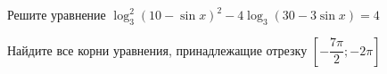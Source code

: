 \begin{ex}
	\begin{condition}
		\begin{enumcols}[label=\asbuk*)]
			\item Решите уравнение \( \log_3^2 (10 - \sin x )^2 - 4\log_3 (30 -  3\sin x) = 4 \)
			\item Найдите все корни уравнения, принадлежащие отрезку \( \left[-\dfrac{7\pi}{2};-2\pi\right] \)
		\end{enumcols}
	\end{condition}
\end{ex}